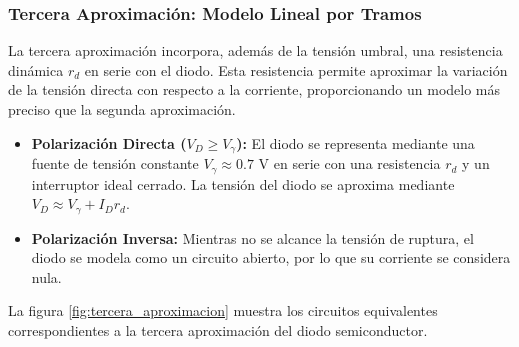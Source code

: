\subsubsection{Tercera Aproximación: Modelo Lineal por Tramos}

La tercera aproximación incorpora, además de la tensión umbral, una resistencia dinámica $r_d$ en serie con el diodo. Esta resistencia permite aproximar la variación de la tensión directa con respecto a la corriente, proporcionando un modelo más preciso que la segunda aproximación.

\begin{itemize}
    \item \textbf{Polarización Directa ($V_D \geq V_\gamma$):} El diodo se representa mediante una fuente de tensión constante $V_\gamma \approx 0.7\text{ V}$ en serie con una resistencia $r_d$ y un interruptor ideal cerrado. La tensión del diodo se aproxima mediante $V_D \approx V_\gamma + I_Dr_d$.

    \item \textbf{Polarización Inversa:} Mientras no se alcance la tensión de ruptura, el diodo se modela como un circuito abierto, por lo que su corriente se considera nula.
\end{itemize}

La figura \ref{fig:tercera_aproximacion} muestra los circuitos equivalentes correspondientes a la tercera aproximación del diodo semiconductor.

